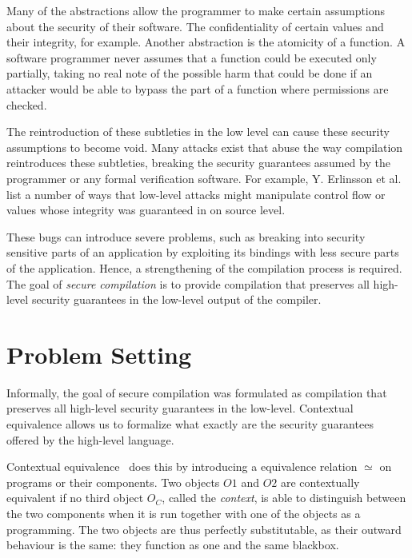 \documentclass[11pt]{article}
\begin{document}
Many of the abstractions allow the programmer to make certain assumptions about the security of their software.
The confidentiality of certain values and their integrity, for example.
Another abstraction is the atomicity of a function.
A software programmer never assumes that a function could be executed only partially, taking no real note of the possible harm that could be done if an attacker would be able to bypass the part of a function where permissions are checked.

The reintroduction of these subtleties in the low level can cause these security assumptions to become void.
Many attacks exist that abuse the way compilation reintroduces these subtleties, breaking the security guarantees assumed by the programmer or any formal verification software.
For example, Y. Erlinsson et al.~\cite{OVSPaper} list a number of ways that low-level attacks might manipulate control flow or values whose integrity was guaranteed in on source level.

These bugs can introduce severe problems, such as breaking into security sensitive parts of an application by exploiting its bindings with less secure parts of the application.
Hence, a strengthening of the compilation process is required.
The goal of \emph{secure compilation} is to provide compilation that preserves all high-level security guarantees in the low-level output of the compiler.

\section{Problem Setting}
Informally, the goal of secure compilation was formulated as compilation that preserves all high-level security guarantees in the low-level.
Contextual equivalence allows us to formalize what exactly are the security guarantees offered by the high-level language.

Contextual equivalence~\cite{Agten:2012:SCM:2354412.2355247} does this by introducing a equivalence relation $\simeq$ on programs or their components.
Two objects $O1$ and $O2$ are contextually equivalent if no third object $O_C$, called the \emph{context}, is able to distinguish between the two components when it is run together with one of the objects as a programming.
The two objects are thus perfectly substitutable, as their outward behaviour is the same: they function as one and the same blackbox.
\end{document}
